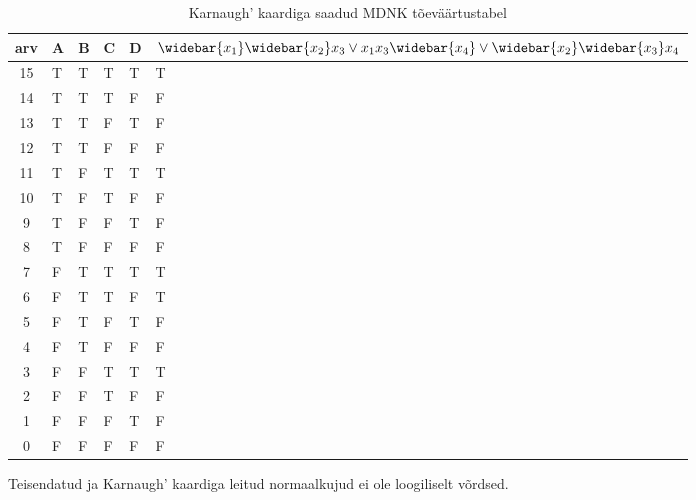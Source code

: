 \documentclass{article}
\begin{document}
\begin{table}[H]
\centering
\caption{Karnaugh' kaardiga saadud MDNK tõeväärtustabel}
\label{my-label}
\begin{tabular}{|c|l|l|l|l|l|}
\hline
arv & A & B & C & D & $\widebar{x_1}\widebar{x_2}x_3 \lor x_1x_3\widebar{x_4} \lor \widebar{x_2}\widebar{x_3}x_4$ \\\hline
15 & T & T & T & T & T                                         \\ \hline
14 & T & T & T & F & F                                         \\ \hline
13 & T & T & F & T & F                                         \\ \hline
12 & T & T & F & F & F                                         \\ \hline
11 & T & F & T & T & T                                         \\ \hline
10 & T & F & T & F & F                                         \\ \hline
9 & T & F & F & T & F                                         \\ \hline
8 & T & F & F & F & F                                         \\ \hline
7 & F & T & T & T & T                                         \\ \hline
6 & F & T & T & F & T                                         \\ \hline
5 & F & T & F & T & F                                         \\ \hline
4 & F & T & F & F & F                                         \\ \hline
3 & F & F & T & T & T                                         \\ \hline
2 & F & F & T & F & F                                         \\ \hline
1 & F & F & F & T & F                                         \\ \hline
0 & F & F & F & F & F                                         \\ \hline
\end{tabular}
\end{table}
Teisendatud ja Karnaugh' kaardiga leitud normaalkujud ei ole loogiliselt võrdsed.
\end{document}
